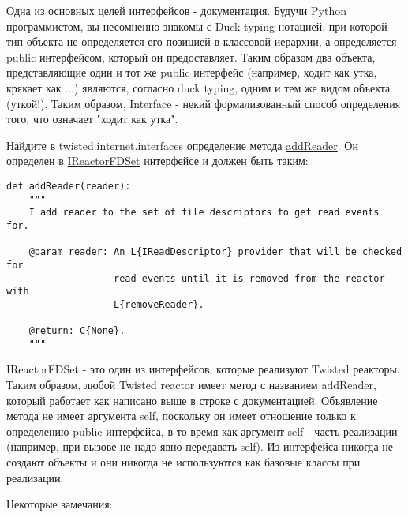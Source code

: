 Одна из основных целей интерфейсов - документация. Будучи 
Python программистом, вы несомненно знакомы с 
\href{http://en.wikipedia.org/wiki/Duck\_typing}{Duck typing} 
нотацией, при которой тип объекта не определяется его 
позицией в классовой иерархии, а определяется public 
интерфейсом, который он предоставляет. Таким образом два 
объекта, представляющие один и тот же public интерфейс (например, 
ходит как утка, крякает как ...) являются, согласно duck typing, 
одним и тем же видом объекта (уткой!). Таким образом, Interface - 
некий формализованный способ определения того, что означает 
"ходит как утка". 


Найдите в twisted.internet.interfaces определение метода 
\href{http://twistedmatrix.com/trac/browser/tags/releases/twisted-8.2.0/twisted/internet/interfaces.py#L810}{addReader}. 
Он определен в  
\href{http://twistedmatrix.com/trac/browser/tags/releases/twisted-8.2.0/twisted/internet/interfaces.py#L801}{IReactorFDSet} интерфейсе и должен быть таким:


 \begin{verbatim}
def addReader(reader):
    """
    I add reader to the set of file descriptors to get read events for.

    @param reader: An L{IReadDescriptor} provider that will be checked for
                   read events until it is removed from the reactor with
                   L{removeReader}.

    @return: C{None}.
    """
\end{verbatim} 


IReactorFDSet - это один из интерфейсов, которые реализуют 
Twisted реакторы. Таким образом, любой Twisted reactor имеет 
метод с названием addReader, который работает как написано 
выше в строке с документацией. Объявление метода не имеет 
аргумента self, поскольку он имеет отношение только к определению 
public интерфейса, в то время как аргумент self - часть 
реализации (например, при вызове не надо явно передавать self). 
Из интерфейса никогда не создают объекты и они никогда не 
используются как базовые классы при  реализации.


Некоторые замечания:

